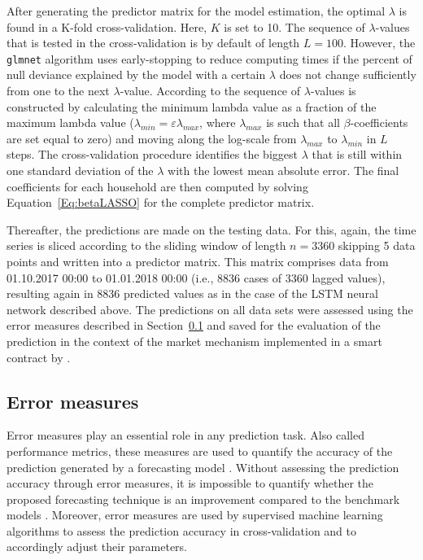 After generating the predictor matrix for the model estimation, the optimal $\lambda$ is found in a K-fold cross-validation. Here, $K$ is set to 10. The sequence of $\lambda$-values that is tested in the cross-validation is by default of length $L=100$. However, the \texttt{glmnet} algorithm uses early-stopping to reduce computing times if the percent of null deviance explained by the model with a certain $\lambda$ does not change sufficiently from one to the next $\lambda$-value. According to \citet{Friedman:2010} the sequence of $\lambda$-values is constructed by calculating the minimum lambda value as a fraction of the maximum lambda value ($\lambda_{min}=\varepsilon\lambda_{max}$, where $\lambda_{max}$ is such that all $\beta$-coefficients are set equal to zero) and moving along the log-scale from $\lambda_{max}$ to $\lambda_{min}$ in $L$ steps. The cross-validation procedure identifies the biggest $\lambda$ that is still within one standard deviation of the $\lambda$ with the lowest mean absolute error. The final coefficients for each household are then computed by solving Equation~\ref{Eq:betaLASSO} for the complete predictor matrix.

Thereafter, the predictions are made on the testing data. For this, again, the time series is sliced according to the sliding window of length $n=3360$ skipping 5 data points and written into a predictor matrix. This matrix comprises data from 01.10.2017 00:00 to 01.01.2018 00:00 (i.e., 8836 cases of 3360 lagged values), resulting again in 8836 predicted values as in the case of the LSTM neural network described above. The predictions on all data sets were assessed using the error measures described in Section~\ref{Sec:Method;Subsec:Error} and saved for the evaluation of the prediction in the context of the market mechanism implemented in a smart contract by \citet{Mengelkamp:2018a}.



\subsection{Error measures} \label{Sec:Method;Subsec:Error}

Error measures play an essential role in any prediction task. Also called performance metrics, these measures are used to quantify the accuracy of the prediction generated by a forecasting model \citep{zor:2017}. Without assessing the prediction accuracy through error measures, it is impossible to quantify whether the proposed forecasting technique is an improvement compared to the benchmark models \citep{Meer:2018}. Moreover, error measures are used by supervised machine learning algorithms to assess the prediction accuracy in cross-validation and to accordingly adjust their parameters.


